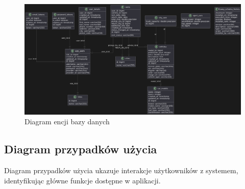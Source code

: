 \documentclass[12pt]{article}
\begin{document}
	\begin{figure}[H]
		\centering
		\includegraphics[width=1\linewidth]{diagram_bd}
		\caption{Diagram encji bazy danych}
		\label{fig:diagram_bd.png}
	\end{figure}
	
	\newpage
	\subsection{Diagram przypadków użycia}
	Diagram przypadków użycia ukazuje interakcje użytkowników z systemem, identyfikując główne funkcje dostępne w aplikacji.
	
\end{document}
